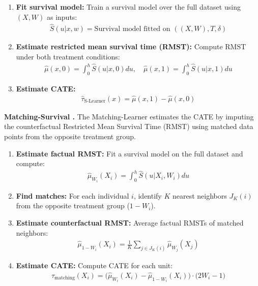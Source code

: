 \documentclass{article} %
\begin{document}
\begin{enumerate}[leftmargin=20pt, itemsep=0pt]
    \item \textbf{Fit survival model:} Train a survival model over the full dataset using $(X, W)$ as inputs:
    \begin{align*}
        \widehat{S}(u | x, w) = \text{Survival model fitted on } ((X, W), T, \delta)
    \end{align*}
    \item \textbf{Estimate restricted mean survival time (RMST):} Compute RMST under both treatment conditions:
    \begin{align*}
        \widehat{\mu}(x, 0) = \int_0^h \widehat{S}(u|x, 0) du, \quad \widehat{\mu}(x, 1) = \int_0^h \widehat{S}(u|x, 1) du
    \end{align*}
    \item \textbf{Estimate CATE:} 
    \begin{align*}
        \widehat{\tau}_{\text{S-Learner}}(x) = \widehat{\mu}(x,1) - \widehat{\mu}(x,0)
    \end{align*}
\end{enumerate}

\textbf{Matching-Survival \citep{noroozizadeh2025impact}.}
The Matching-Learner estimates the CATE by imputing the counterfactual Restricted Mean Survival Time (RMST) using matched data points from the opposite treatment group.

\begin{enumerate}[leftmargin=20pt, itemsep=0pt]
    \item \textbf{Estimate factual RMST:} Fit a survival model on the full dataset and compute:
    \begin{align*}
        \widehat{\mu}_{W_i}(X_i) = \int_0^h \widehat{S}(u | X_i, W_i) du
    \end{align*}
    \item \textbf{Find matches:} For each individual $i$, identify $K$ nearest neighbors $J_K(i)$ from the opposite treatment group (\(1-W_i\)).
    \item \textbf{Estimate counterfactual RMST:} Average factual RMSTs of matched neighbors:
    \begin{align*}
        \widehat{\mu}_{1-W_i}(X_i) = \frac{1}{K} \sum_{j \in J_K(i)} \widehat{\mu}_{W_j}(X_j)
    \end{align*}
    \item \textbf{Estimate CATE:} Compute CATE for each unit:
    \begin{align*}
        \widehat{\tau}_{\text{matching}}(X_i) = \big(\widehat{\mu}_{W_i}(X_i) - \widehat{\mu}_{1-W_i} (X_i)\big) \cdot \big(2 W_i - 1 \big)
    \end{align*}
\end{enumerate}
\end{document}

